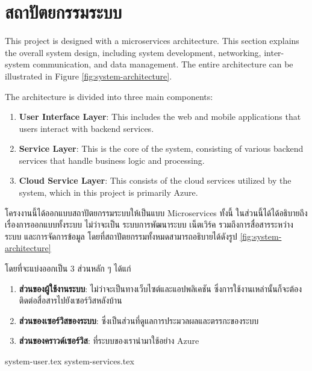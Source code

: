 \section{สถาปัตยกรรมระบบ}
\ifenglish
This project is designed with a microservices architecture. This section explains the overall system design, including system development, networking, inter-system communication, and data management. The entire architecture can be illustrated in Figure \ref{fig:system-architecture}. 

The architecture is divided into three main components: 
\begin{enumerate}
    \item \textbf{User Interface Layer}: This includes the web and mobile applications that users interact with backend services.
    \item \textbf{Service Layer}: This is the core of the system, consisting of various backend services that handle business logic and processing.
    \item \textbf{Cloud Service Layer}: This consists of the cloud services utilized by the system, which in this project is primarily Azure.
\end{enumerate}
\else
โครงงานนี้ได้ออกแบบสถาปัตยกรรมระบบให้เป็นแบบ Microservices ทั้งนี้ ในส่วนนี้ได้ได้อธิบายถึงเรื่องการออกแบบทั้งระบบ ไม่ว่าจะเป็น ระบบการพัฒนาระบบ เน็ตเวิร์ค รวมถึงการสื่อสารระหว่างระบบ และการจัดการข้อมูล โดยที่สถาปัตยกรรมทั้งหมดสามารถอธิบายได้ดังรูป \ref{fig:system-architecture} 

โดยที่จะแบ่งออกเป็น 3 ส่วนหลัก ๆ ได้แก่
\begin{enumerate}
    \item \textbf{ส่วนของผู้ใช้งานระบบ}: ไม่ว่าจะเป็นทางเว็บไซต์และแอปพลิเคชัน ซึ่งการใช้งานเหล่านั้นก็จะต้องติดต่อสื่อสารไปยังเซอร์วิสหลังบ้าน
    \item \textbf{ส่วนของเซอร์วิสของระบบ}: ซึ่งเป็นส่วนที่ดูแลการประมวลผลและตรรกะของระบบ
    \item \textbf{ส่วนของคราวด์เซอร์วิส}: ที่ระบบของเรานำมาใช้อย่าง Azure
\end{enumerate}
\fi


{system-user.tex}
{system-services.tex}

\clearpage
\begin{landscape}
\end{landscape}